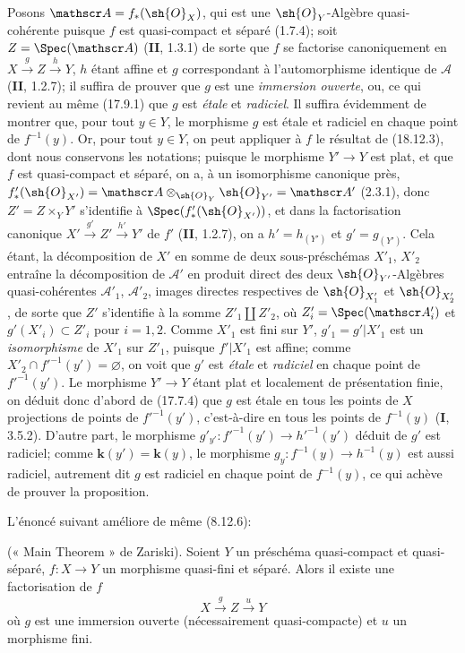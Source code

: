 Posons $\mathscr A=f_*(\sh{O}_X)$, qui est une $\sh{O}_Y$-Algèbre quasi-cohérente puisque $f$ est quasi-compact et séparé (1.7.4); soit $Z=\Spec(\mathscr A)$ (\textbf{II}, 1.3.1) de sorte que $f$ se factorise canoniquement en $X\xrightarrow{g}Z\xrightarrow{h}Y$, $h$ étant affine et $g$ correspondant à l'automorphisme identique de $\mathscr A$ (\textbf{II}, 1.2.7); il suffira de prouver que $g$ est une \emph{immersion ouverte}, ou, ce qui revient au même (17.9.1) que $g$ est \emph{étale} et \emph{radiciel}. Il suffira évidemment de montrer que, pour tout $y\in Y$, le morphisme $g$ est étale et radiciel en chaque point de $f^{-1}(y)$. Or, pour tout $y\in Y$, on peut appliquer à $f$ le résultat de (18.12.3), dont nous conservons les notations; puisque le morphisme $Y'\to Y$ est plat, et que $f$ est quasi-compact et séparé, on a, à un isomorphisme canonique près, $f'_*(\sh{O}_{X'})=\mathscr A\otimes_{\sh{O}_Y}\sh{O}_{Y'}=\mathscr A'$ (2.3.1), donc $Z'=Z\times_Y Y'$ s'identifie à $\Spec(f'_*(\sh{O}_{X'}))$, et dans la factorisation canonique $X'\xrightarrow{g'}Z'\xrightarrow{h'}Y'$ de $f'$ (\textbf{II}, 1.2.7), on a $h'=h_{(Y')}$ et $g'=g_{(Y')}$. Cela étant, la décomposition de $X'$ en somme de deux sous-préschémas $X'_1$, $X'_2$ entraîne la décomposition de $\mathscr A'$ en produit direct des deux $\sh{O}_{Y'}$-Algèbres quasi-cohérentes $\mathscr A'_1$, $\mathscr A'_2$, images directes respectives de $\sh{O}_{X'_1}$ et $\sh{O}_{X'_2}$, de sorte que $Z'$ s'identifie à la somme $Z'_1\amalg Z'_2$, où $Z'_i=\Spec(\mathscr A'_i)$ et $g'(X'_i)\subset Z'_i$ pour $i=1,2$. Comme $X'_1$ est fini sur $Y'$, $g'_1=g'|X'_1$ est un \emph{isomorphisme} de $X'_1$ sur $Z'_1$, puisque $f'|X'_1$ est affine; comme $X'_2\cap f'^{-1}(y')=\varnothing$, on voit que $g'$ est \emph{étale} et \emph{radiciel} en chaque point de $f'^{-1}(y')$. Le morphisme $Y'\to Y$ étant plat et localement de présentation finie, on déduit donc d'abord de (17.7.4) que $g$ est étale en tous les points de $X$ projections de points de $f'^{-1}(y')$, c'est-à-dire en tous les points de $f^{-1}(y)$ (\textbf{I}, 3.5.2). D'autre part, le morphisme $g'_{y'}:f'^{-1}(y')\longrightarrow h'^{-1}(y')$ déduit de $g'$ est radiciel; comme $\boldsymbol{k}(y')=\boldsymbol{k}(y)$, le morphisme $g_y:f^{-1}(y)\to h^{-1}(y)$ est aussi radiciel, autrement dit $g$ est radiciel en chaque point de $f^{-1}(y)$, ce qui achève de prouver la proposition.

L'énoncé suivant améliore de même (8.12.6):

\begin{corollary}[18.12.13]
\label{IV.18.12.13}
(« Main Theorem » de Zariski). Soient $Y$ un préschéma quasi-compact et quasi-séparé, $f:X\to Y$ un morphisme quasi-fini et séparé. Alors il existe une factorisation de $f$
\[
  X\xrightarrow{g}Z\xrightarrow{u}Y
\]
où $g$ est une immersion ouverte (nécessairement quasi-compacte) et $u$ un morphisme fini.
\end{corollary}

